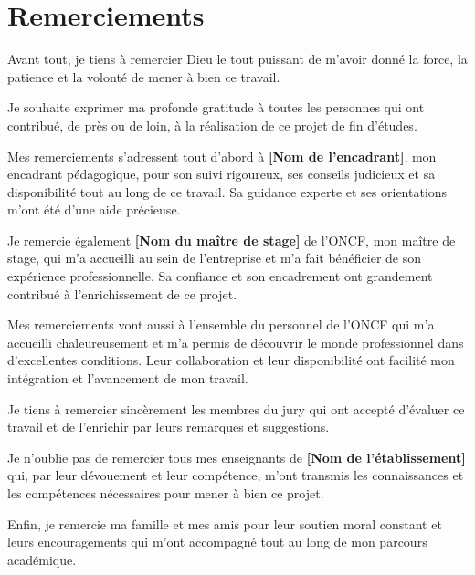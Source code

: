 \chapter*{Remerciements}

Avant tout, je tiens à remercier Dieu le tout puissant de m'avoir donné la force, la patience et la volonté de mener à bien ce travail.

Je souhaite exprimer ma profonde gratitude à toutes les personnes qui ont contribué, de près ou de loin, à la réalisation de ce projet de fin d'études.

Mes remerciements s'adressent tout d'abord à \textbf{[Nom de l'encadrant]}, mon encadrant pédagogique, pour son suivi rigoureux, ses conseils judicieux et sa disponibilité tout au long de ce travail. Sa guidance experte et ses orientations m'ont été d'une aide précieuse.

Je remercie également \textbf{[Nom du maître de stage]} de l'ONCF, mon maître de stage, qui m'a accueilli au sein de l'entreprise et m'a fait bénéficier de son expérience professionnelle. Sa confiance et son encadrement ont grandement contribué à l'enrichissement de ce projet.

Mes remerciements vont aussi à l'ensemble du personnel de l'ONCF qui m'a accueilli chaleureusement et m'a permis de découvrir le monde professionnel dans d'excellentes conditions. Leur collaboration et leur disponibilité ont facilité mon intégration et l'avancement de mon travail.

Je tiens à remercier sincèrement les membres du jury qui ont accepté d'évaluer ce travail et de l'enrichir par leurs remarques et suggestions.

Je n'oublie pas de remercier tous mes enseignants de \textbf{[Nom de l'établissement]} qui, par leur dévouement et leur compétence, m'ont transmis les connaissances et les compétences nécessaires pour mener à bien ce projet.

Enfin, je remercie ma famille et mes amis pour leur soutien moral constant et leurs encouragements qui m'ont accompagné tout au long de mon parcours académique.

\vfill

\newpage